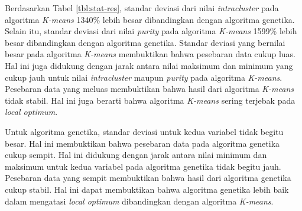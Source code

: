 \begin{enumerate}
	Berdasarkan Tabel \ref{tbl:stat-res}, standar deviasi dari nilai \textit{intracluster} pada algoritma \textit{K-means} 1340\% lebih besar dibandingkan dengan algoritma genetika. Selain itu, standar deviasi dari nilai \textit{purity} pada algoritma \textit{K-means} 1599\% lebih besar dibandingkan dengan algoritma genetika. Standar deviasi yang bernilai besar pada algoritma \textit{K-means} membuktikan bahwa pesebaran data cukup luas. Hal ini juga didukung dengan jarak antara nilai maksimum dan minimum yang cukup jauh untuk nilai \textit{intracluster} maupun \textit{purity} pada algoritma \textit{K-means}. Pesebaran data yang meluas membuktikan bahwa hasil dari algoritma \textit{K-means} tidak stabil. Hal ini juga berarti bahwa algoritma \textit{K-means} sering terjebak pada \textit{local optimum}.
	
	Untuk algoritma genetika, standar deviasi untuk kedua variabel tidak begitu besar. Hal ini membuktikan bahwa pesebaran data pada algoritma genetika cukup sempit. Hal ini didukung dengan jarak antara nilai minimum dan maksimum untuk kedua variabel pada algoritma genetika tidak begitu jauh. Pesebaran data yang sempit membuktikan bahwa hasil dari algoritma genetika cukup stabil. Hal ini dapat membuktikan bahwa algoritma genetika lebih baik dalam mengatasi \textit{local optimum} dibandingkan dengan algoritma \textit{K-means}.
\end{enumerate}